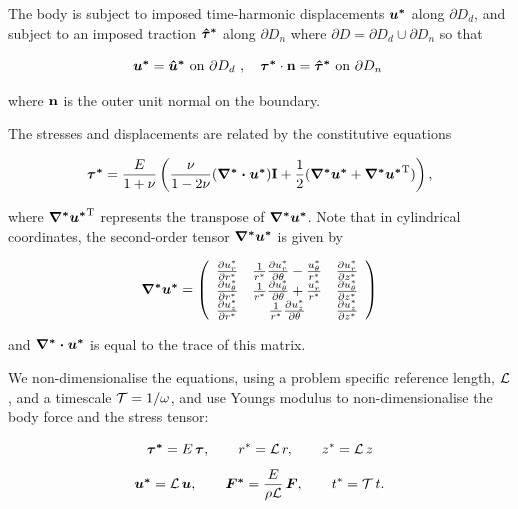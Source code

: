 The body is subject to imposed time-\/harmonic displacements $ \mbox{\boldmath$ u^*$} $ along $ \partial D_d $, and subject to an imposed traction $ \mbox{\boldmath$ \hat{\tau}^*$} $ along $ \partial D_n $ where $ \partial D=\partial D_d\cup\partial D_n $ so that \begin{center} \[ \mbox{\boldmath$ u^*$}=\mbox{\boldmath$ \hat{u}^*$}\,\,\textrm{on $ \partial D_d $ },\quad \mbox{\boldmath$ \tau^*$} \cdot {\bf n}=\mbox{\boldmath$ \hat{\tau}^*$}\,\,\textrm{on $ \partial D_n $ } \] \end{center}  where $ {\bf n} $ is the outer unit normal on the boundary.

The stresses and displacements are related by the constitutive equations \begin{center} \[ \mbox{\boldmath$ \tau^*$}=\frac{E}{1+\nu}\left( \frac{\nu}{1-2\nu}(\mbox{\boldmath$\nabla^*\cdot u^*$})\textbf{I}+ \frac{1}{2}(\mbox{\boldmath$ \nabla^* u^*$}+\mbox{\boldmath$ \nabla^* u^*$}^{{\rm T}})\right), \] \end{center}  where $ \mbox{\boldmath$ \nabla^* u^*$}^{{\rm T}} $ represents the transpose of $ \mbox{\boldmath$ \nabla^* u^*$} $. Note that in cylindrical coordinates, the second-\/order tensor $ \mbox{\boldmath$ \nabla^* u^*$} $ is given by \begin{center} \[ \mbox{\boldmath$ \nabla^* u^*$}= { \left(\begin{array}{ccc} \frac{\partial u^*_r}{\partial r^*}& \frac{1}{r^*}\frac{\partial u^*_r}{\partial\theta}-\frac{u^*_\theta}{r^*}& \frac{\partial u^*_r}{\partial z^*}\\ \frac{\partial u^*_\theta}{\partial r^*}& \frac{1}{r^*}\frac{\partial u^*_\theta}{\partial\theta}+\frac{u^*_r}{r^*}& \frac{\partial u^*_\theta}{\partial z^*}\\ \frac{\partial u^*_z}{\partial r^*}& \frac{1}{r^*}\frac{\partial u^*_z}{\partial\theta}& \frac{\partial u^*_z}{\partial z^*}\end{array}\right) } \] \end{center}  and $ \mbox{\boldmath$\nabla^*\cdot u^*$} $ is equal to the trace of this matrix.

We non-\/dimensionalise the equations, using a problem specific reference length, $ {\cal L} $, and a timescale $ {\cal T}=1/\omega $, and use Young\textquotesingle{}s modulus to non-\/dimensionalise the body force and the stress tensor\+: \begin{center} \[ \mbox{\boldmath$ \tau^*$} = E \, \mbox{\boldmath$ \tau$}, \qquad r^* = {\cal L}\, r, \qquad z^* = {\cal L}\, z \] \[ \mbox{\boldmath$ u^*$} = {\cal L}\, \mbox{\boldmath$ u$}, \qquad \mbox{\boldmath$ F^*$} = \frac{E}{\rho \cal L} \, \mbox{\boldmath$ F$}, \qquad t^* = {\cal T}\, t. \] \end{center} 

